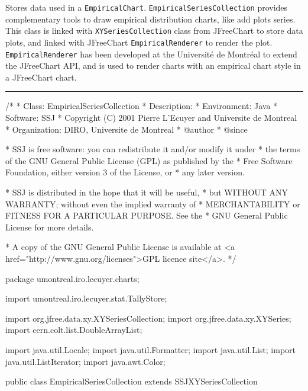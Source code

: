 
Stores data used in a \texttt{EmpiricalChart}. %
\texttt{EmpiricalSeriesCollection} provides complementary tools to draw
empirical distribution charts, like add plots series.
This class is linked with \texttt{XYSeriesCollection} class from JFreeChart
to store data plots, and linked with JFreeChart \texttt{EmpiricalRenderer} to
render the plot. \texttt{EmpiricalRenderer} has been developed at the
Universit\'e de Montr\'eal to extend the JFreeChart API, and is used to render
charts with an empirical chart style in a JFreeChart chart.

\bigskip\hrule
\begin{code}
\begin{hide}
/*
 * Class:        EmpiricalSeriesCollection
 * Description:  
 * Environment:  Java
 * Software:     SSJ 
 * Copyright (C) 2001  Pierre L'Ecuyer and Universite de Montreal
 * Organization: DIRO, Universite de Montreal
 * @author       
 * @since

 * SSJ is free software: you can redistribute it and/or modify it under
 * the terms of the GNU General Public License (GPL) as published by the
 * Free Software Foundation, either version 3 of the License, or
 * any later version.

 * SSJ is distributed in the hope that it will be useful,
 * but WITHOUT ANY WARRANTY; without even the implied warranty of
 * MERCHANTABILITY or FITNESS FOR A PARTICULAR PURPOSE.  See the
 * GNU General Public License for more details.

 * A copy of the GNU General Public License is available at
   <a href="http://www.gnu.org/licenses">GPL licence site</a>.
 */
\end{hide}
package umontreal.iro.lecuyer.charts;\begin{hide}

import   umontreal.iro.lecuyer.stat.TallyStore;

import   org.jfree.data.xy.XYSeriesCollection;
import   org.jfree.data.xy.XYSeries;
import   cern.colt.list.DoubleArrayList;

import   java.util.Locale;
import   java.util.Formatter;
import   java.util.List;
import   java.util.ListIterator;
import   java.awt.Color;\end{hide}

public class EmpiricalSeriesCollection extends SSJXYSeriesCollection \begin{hide} {

}
\end{hide}
\end{code}

